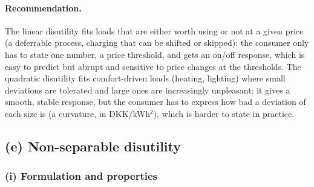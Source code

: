 \paragraph{Recommendation.} The linear disutility fits loads that are either worth using or not at a given price (a deferrable process, charging that can be shifted or skipped): the consumer only has to state one number, a price threshold, and gets an on/off response, which is easy to predict but abrupt and sensitive to price changes at the thresholds. The quadratic disutility fits comfort-driven loads (heating, lighting) where small deviations are tolerated and large ones are increasingly unpleasant: it gives a smooth, stable response, but the consumer has to express how bad a deviation of each size is (a curvature, in DKK/kWh$^2$), which is harder to state in practice.


\subsection{(e) Non-separable disutility}

\subsubsection{(i) Formulation and properties}

